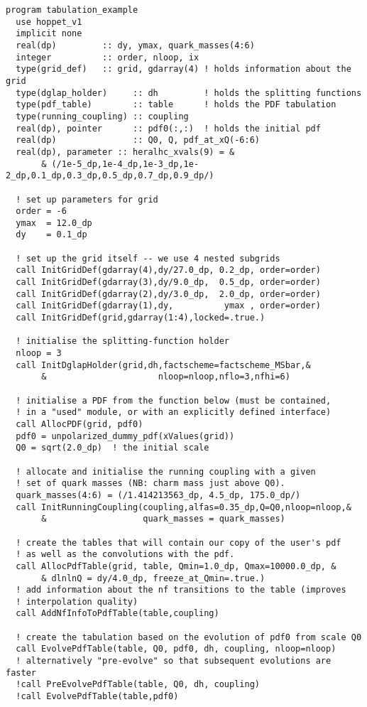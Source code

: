\documentclass[12pt]{article}
\begin{document}
\begin{lstlisting}
program tabulation_example
  use hoppet_v1
  implicit none
  real(dp)         :: dy, ymax, quark_masses(4:6)
  integer          :: order, nloop, ix
  type(grid_def)   :: grid, gdarray(4) ! holds information about the grid
  type(dglap_holder)     :: dh         ! holds the splitting functions
  type(pdf_table)        :: table      ! holds the PDF tabulation
  type(running_coupling) :: coupling  
  real(dp), pointer      :: pdf0(:,:)  ! holds the initial pdf
  real(dp)               :: Q0, Q, pdf_at_xQ(-6:6)
  real(dp), parameter :: heralhc_xvals(9) = &
       & (/1e-5_dp,1e-4_dp,1e-3_dp,1e-2_dp,0.1_dp,0.3_dp,0.5_dp,0.7_dp,0.9_dp/)

  ! set up parameters for grid
  order = -6
  ymax  = 12.0_dp
  dy    = 0.1_dp
  
  ! set up the grid itself -- we use 4 nested subgrids
  call InitGridDef(gdarray(4),dy/27.0_dp, 0.2_dp, order=order)
  call InitGridDef(gdarray(3),dy/9.0_dp,  0.5_dp, order=order)
  call InitGridDef(gdarray(2),dy/3.0_dp,  2.0_dp, order=order)
  call InitGridDef(gdarray(1),dy,          ymax , order=order)
  call InitGridDef(grid,gdarray(1:4),locked=.true.)

  ! initialise the splitting-function holder
  nloop = 3
  call InitDglapHolder(grid,dh,factscheme=factscheme_MSbar,&
       &                      nloop=nloop,nflo=3,nfhi=6)

  ! initialise a PDF from the function below (must be contained,
  ! in a "used" module, or with an explicitly defined interface)
  call AllocPDF(grid, pdf0)
  pdf0 = unpolarized_dummy_pdf(xValues(grid))
  Q0 = sqrt(2.0_dp)  ! the initial scale

  ! allocate and initialise the running coupling with a given
  ! set of quark masses (NB: charm mass just above Q0).
  quark_masses(4:6) = (/1.414213563_dp, 4.5_dp, 175.0_dp/)
  call InitRunningCoupling(coupling,alfas=0.35_dp,Q=Q0,nloop=nloop,&
       &                   quark_masses = quark_masses)

  ! create the tables that will contain our copy of the user's pdf
  ! as well as the convolutions with the pdf.
  call AllocPdfTable(grid, table, Qmin=1.0_dp, Qmax=10000.0_dp, & 
       & dlnlnQ = dy/4.0_dp, freeze_at_Qmin=.true.)
  ! add information about the nf transitions to the table (improves
  ! interpolation quality)
  call AddNfInfoToPdfTable(table,coupling)

  ! create the tabulation based on the evolution of pdf0 from scale Q0
  call EvolvePdfTable(table, Q0, pdf0, dh, coupling, nloop=nloop)
  ! alternatively "pre-evolve" so that subsequent evolutions are faster
  !call PreEvolvePdfTable(table, Q0, dh, coupling)
  !call EvolvePdfTable(table,pdf0)


\end{lstlisting}
\end{document}
